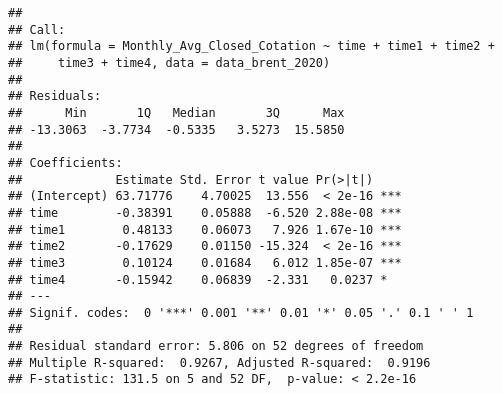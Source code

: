 \documentclass[
]{article}
\begin{document}
\begin{verbatim}
## 
## Call:
## lm(formula = Monthly_Avg_Closed_Cotation ~ time + time1 + time2 + 
##     time3 + time4, data = data_brent_2020)
## 
## Residuals:
##      Min       1Q   Median       3Q      Max 
## -13.3063  -3.7734  -0.5335   3.5273  15.5850 
## 
## Coefficients:
##             Estimate Std. Error t value Pr(>|t|)    
## (Intercept) 63.71776    4.70025  13.556  < 2e-16 ***
## time        -0.38391    0.05888  -6.520 2.88e-08 ***
## time1        0.48133    0.06073   7.926 1.67e-10 ***
## time2       -0.17629    0.01150 -15.324  < 2e-16 ***
## time3        0.10124    0.01684   6.012 1.85e-07 ***
## time4       -0.15942    0.06839  -2.331   0.0237 *  
## ---
## Signif. codes:  0 '***' 0.001 '**' 0.01 '*' 0.05 '.' 0.1 ' ' 1
## 
## Residual standard error: 5.806 on 52 degrees of freedom
## Multiple R-squared:  0.9267, Adjusted R-squared:  0.9196 
## F-statistic: 131.5 on 5 and 52 DF,  p-value: < 2.2e-16
\end{verbatim}
\end{document}
